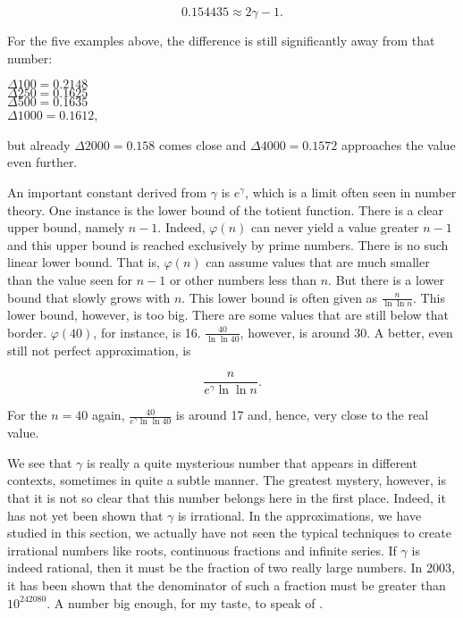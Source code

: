 \documentclass[tikz]{scrreprt}
\begin{document}
\begin{equation}
0.154435 \approx 2\gamma - 1.
\end{equation}

For the five examples above, the difference
is still significantly away from that number:

$\Delta 100 = 0.2148$\\
$\Delta 250 = 0.1625$\\
$\Delta 500 = 0.1635$\\
$\Delta 1000= 0.1612$,

but already $\Delta 2000 = 0.158$ comes close and
$\Delta 4000 = 0.1572$ 
approaches the value even further.

An important constant derived from $\gamma$ is
$e^{\gamma}$, which is a limit often seen in 
number theory. One instance is the lower bound
of the totient function. There is a clear upper bound,
namely $n-1$. Indeed, $\varphi(n)$ can never 
yield a value greater $n-1$ and this upper bound
is reached exclusively by prime numbers.
There is no such linear lower bound. 
That is, $\varphi(n)$ can assume values that are much smaller
than the value seen for $n-1$ or other numbers less than $n$.
But there is a lower bound that slowly grows with $n$.
This lower bound is often given as $\frac{n}{\ln\ln n}$.
This lower bound, however, is too big.
There are some values that are still below that border.
$\varphi(40)$, for instance, is 16.
$\frac{40}{\ln \ln 40}$, however, is around 30.
A better, even still not perfect approximation, is

\[
\frac{n}{e^{\gamma}\ln \ln n}.
\]

For the $n=40$ again,
$\frac{40}{e^{\gamma}\ln \ln 40}$ is around 17 and, hence,
very close to the real value.

We see that $\gamma$ is really a quite mysterious number
that appears in different contexts, sometimes in quite
a subtle manner.
The greatest mystery, however, is that it is not so clear
that this number belongs here in the first place.
Indeed, it has not yet been shown that $\gamma$ is irrational.
In the approximations, we have studied in this section,
we actually have not seen 
the typical techniques to create irrational numbers 
like roots, continuous fractions and infinite series.
If $\gamma$ is indeed rational, then it must be the fraction
of two really large numbers. In 2003, it has been shown
that the denominator of such a fraction must be greater
than $10^{242080}$. 
A number big enough, for my taste, to speak of .
\end{document}
